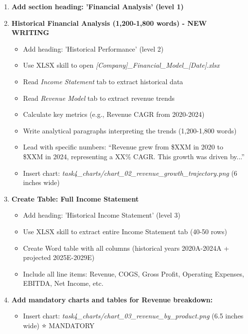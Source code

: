 \documentclass[11pt]{article}
\begin{document}
\begin{enumerate}[leftmargin=*,itemsep=2pt,topsep=2pt]
\item {} \textbf{Add section heading: 'Financial Analysis' (level 1)}
\item {} \textbf{Historical Financial Analysis (1,200-1,800 words) - NEW WRITING}
\begin{itemize}[leftmargin=*,itemsep=2pt,topsep=2pt]
\item {} Add heading: 'Historical Performance' (level 2)
\item {} Use XLSX skill to open \emph{[Company]\_\allowbreak{}Financial\_\allowbreak{}Model\_\allowbreak{}[Date].xlsx}
\item {} Read \emph{Income Statement} tab to extract historical data
\item {} Read \emph{Revenue Model} tab to extract revenue trends
\item {} Calculate key metrics (e.g., Revenue CAGR from 2020-2024)
\item {} Write analytical paragraphs interpreting the trends (1,200-1,800 words)
\item {} Lead with specific numbers: ``Revenue grew from \$XXM in 2020 to \$XXM in 2024, representing a XX\% CAGR. This growth was driven by...''
\item {} Insert chart: \emph{task4\_\allowbreak{}charts/chart\_\allowbreak{}02\_\allowbreak{}revenue\_\allowbreak{}growth\_\allowbreak{}trajectory.png} (6 inches wide)
\end{itemize}
\item {} \textbf{Create Table: Full Income Statement}
\begin{itemize}[leftmargin=*,itemsep=2pt,topsep=2pt]
\item {} Add heading: 'Historical Income Statement' (level 3)
\item {} Use XLSX skill to extract entire Income Statement tab (40-50 rows)
\item {} Create Word table with all columns (historical years 2020A-2024A + projected 2025E-2029E)
\item {} Include all line items: Revenue, COGS, Gross Profit, Operating Expenses, EBITDA, Net Income, etc.
\end{itemize}
\item {} \textbf{Add mandatory charts and tables for Revenue breakdown:}
\begin{itemize}[leftmargin=*,itemsep=2pt,topsep=2pt]
\item {} Insert chart: \emph{task4\_\allowbreak{}charts/chart\_\allowbreak{}03\_\allowbreak{}revenue\_\allowbreak{}by\_\allowbreak{}product.png} (6.5 inches wide) ⭐ MANDATORY

\end{itemize}
\end{enumerate}
\end{document}
